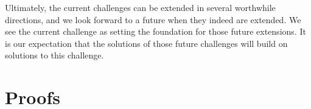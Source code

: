 \documentclass[runningheads]{llncs}
\begin{document}
Ultimately, the current challenges can be extended in several
worthwhile directions, and we look forward to a future when they
indeed are extended. We see the current challenge as setting
the foundation for those future extensions. It is our expectation that
the solutions of those future challenges will build on solutions
to this challenge.




\clearpage
\appendix
\section{Proofs}\label{app:challenges}

\end{document}
